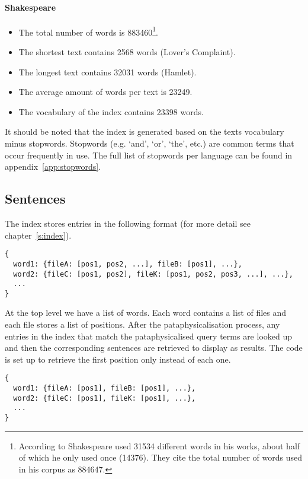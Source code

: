 \paragraph*{Shakespeare}
\begin{itemize}
  \item The total number of words is \num{883460}\footnote{According to \autocite{Efron1976} Shakespeare used \num{31534} different words in his works, about half of which he only used once (\num{14376}). They cite the total number of words used in his corpus as \num{884647}.}.
  \item The shortest text contains \num{2568} words (Lover's Complaint).
  \item The longest text contains \num{32031} words (Hamlet).
  \item The average amount of words per text is \num{23249}.
  \item The vocabulary of the index contains \num{23398} words.
\end{itemize}

It should be noted that the index is generated based on the texts vocabulary minus stopwords. Stopwords (e.g. `and', `or', `the', etc.) are common terms that occur frequently in use. The full list of stopwords per language can be found in appendix~\ref{app:stopwords}.


\subsection{Sentences}
\label{s:sents}

The index stores entries in the following format (for more detail see chapter~\ref{s:index}).

\begin{verbatim}
{
  word1: {fileA: [pos1, pos2, ...], fileB: [pos1], ...},
  word2: {fileC: [pos1, pos2], fileK: [pos1, pos2, pos3, ...], ...},
  ...
}
\end{verbatim}

At the top level we have a list of words. Each word contains a list of files and each file stores a list of positions. After the pataphysicalisation process, any entries in the index that match the pataphysicalised query terms are looked up and then the corresponding sentences are retrieved to display as results. The code is set up to retrieve the first position only instead of each one.

\begin{verbatim}
{
  word1: {fileA: [pos1], fileB: [pos1], ...},
  word2: {fileC: [pos1], fileK: [pos1], ...},
  ...
}
\end{verbatim}


